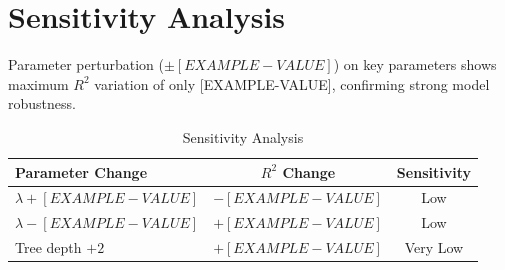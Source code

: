 \section{Sensitivity Analysis}

Parameter perturbation ($\pm [EXAMPLE-VALUE]$) on key parameters shows maximum $R^2$
variation of only [EXAMPLE-VALUE], confirming strong model robustness.

\begin{table}[htbp]
  \centering
  \caption{Sensitivity Analysis}
  \begin{tabular}{lcc}
    \toprule
    \textbf{Parameter Change} & \textbf{$R^2$ Change} & \textbf{Sensitivity} \\
    \midrule
    $\lambda + [EXAMPLE-VALUE]$ & $-[EXAMPLE-VALUE]$ & Low \\
    $\lambda - [EXAMPLE-VALUE]$ & $+[EXAMPLE-VALUE]$ & Low \\
    Tree depth $+2$  & $+[EXAMPLE-VALUE]$ & Very Low \\
    \bottomrule
  \end{tabular}
\end{table}
